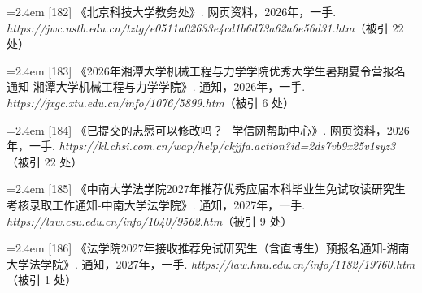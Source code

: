 {\nopagebreak\vspace{1pt}
\noindent\hangindent=2.4em \label{src:S0233}{\color{cAccent}[182]} 《北京科技大学教务处》. 网页资料，2026年，一手. \textit{https://jwc.ustb.edu.cn/tztg/e0511a02633e4cd1b6d73a62a6e56d31.htm}（被引 22 处）\par
\vspace{0.6pt}
\vspace{3.5pt}\par
\nopagebreak\vspace{1pt}
\noindent\hangindent=2.4em \label{src:S0235}{\color{cAccent}[183]} 《2026年湘潭大学机械工程与力学学院优秀大学生暑期夏令营报名通知-湘潭大学机械工程与力学学院》. 通知，2026年，一手. \textit{https://jxgc.xtu.edu.cn/info/1076/5899.htm}（被引 6 处）\par
\vspace{0.6pt}
\vspace{3.5pt}\par
\nopagebreak\vspace{1pt}
\noindent\hangindent=2.4em \label{src:S0236}{\color{cAccent}[184]} 《已提交的志愿可以修改吗？\_学信网帮助中心》. 网页资料，2026年，一手. \textit{https://kl.chsi.com.cn/wap/help/ckjjfa.action?id=2ds7vb9x25v1syz3}（被引 22 处）\par
\vspace{0.6pt}
\vspace{3.5pt}\par
\nopagebreak\vspace{1pt}
\noindent\hangindent=2.4em \label{src:S0237}{\color{cAccent}[185]} 《中南大学法学院2027年推荐优秀应届本科毕业生免试攻读研究生考核录取工作通知-中南大学法学院》. 通知，2027年，一手. \textit{https://law.csu.edu.cn/info/1040/9562.htm}（被引 9 处）\par
\vspace{0.6pt}
\vspace{3.5pt}\par
\nopagebreak\vspace{1pt}
\noindent\hangindent=2.4em \label{src:S0238}{\color{cAccent}[186]} 《法学院2027年接收推荐免试研究生（含直博生）预报名通知-湖南大学法学院》. 通知，2027年，一手. \textit{https://law.hnu.edu.cn/info/1182/19760.htm}（被引 1 处）\par
\vspace{0.6pt}
}
